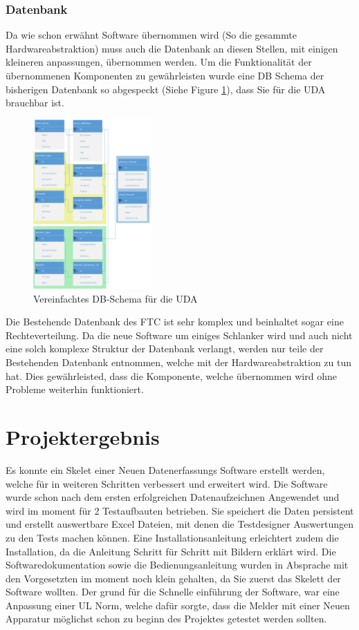 \documentclass[10pt]{scrartcl}
\begin{document}
\subsubsection{Datenbank}
Da wie schon erwähnt Software übernommen wird (So die gesammte Hardwareabstraktion) muss auch die Datenbank an diesen Stellen, mit einigen kleineren anpassungen, übernommen werden. Um die Funktionalität der übernommenen Komponenten zu gewährleisten wurde eine DB Schema der bisherigen Datenbank so abgespeckt (Siehe Figure \ref{fig:DBSchemaUDA}), dass Sie für die UDA brauchbar ist.
\begin{figure}[htbp] 
	\centering
	\includegraphics[width=0.4\textwidth]{DBSchemaUDA}
	\caption{Vereinfachtes DB-Schema für die UDA}
	\label{fig:DBSchemaUDA}
\end{figure}

Die Bestehende Datenbank des FTC ist sehr komplex und beinhaltet sogar eine Rechteverteilung. Da die neue Software um einiges Schlanker wird und auch nicht eine solch komplexe Struktur der Datenbank verlangt, werden nur teile der Bestehenden Datenbank entnommen, welche mit der Hardwareabstraktion zu tun hat. Dies gewährleisted, dass die Komponente, welche übernommen wird ohne Probleme weiterhin funktioniert. 
\section{Projektergebnis}
Es konnte ein Skelet einer Neuen Datenerfassungs Software erstellt werden, welche für in weiteren Schritten verbessert und erweitert wird. Die Software wurde schon nach dem ersten erfolgreichen Datenaufzeichnen Angewendet und wird im moment für 2 Testaufbauten betrieben. Sie speichert die Daten persistent und erstellt auswertbare Excel Dateien, mit denen die Testdesigner Auswertungen zu den Tests machen können.
Eine Installationsanleitung erleichtert zudem die Installation, da die Anleitung Schritt für Schritt mit Bildern erklärt wird.
Die Softwaredokumentation sowie die Bedienungsanleitung wurden in Absprache mit den Vorgesetzten im moment noch klein gehalten, da Sie zuerst das Skelett der Software wollten. Der grund für die Schnelle einführung der Software, war eine Anpassung einer UL Norm, welche dafür sorgte, dass die Melder mit einer Neuen Apparatur möglichst schon zu beginn des Projektes getestet werden sollten.
\end{document}
